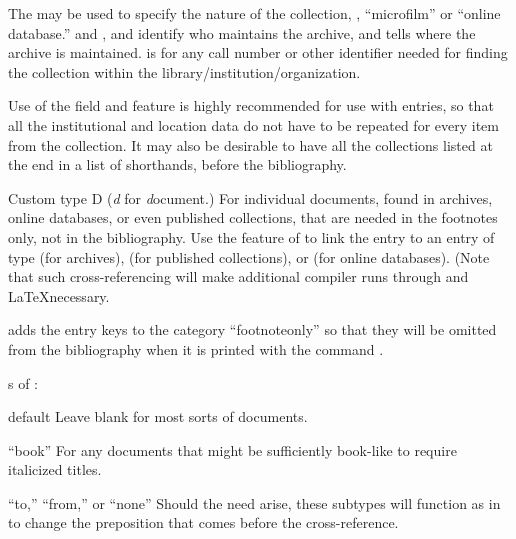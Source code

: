 \documentclass{ltxdockit}[2010/02/12]
\begin{document}
\begin{typelist}
The  may be used to specify the nature of the collection, \eg, ``microfilm'' or  ``online database.''  and , and  identify who maintains the archive, and  tells where the archive is maintained.   is for any call number or other identifier needed for finding the collection within the library/institution/organization.

Use of the   field and feature is highly recommended for use with  entries, so that all the institutional and location data do not have to be repeated for every item from the collection. It may also be desirable to have all the collections listed at the end in a list of shorthands, before the bibliography.



Custom type D (\emph{d} for \emph{d}ocument.)
For individual documents, found in archives, online databases, or even published collections, that are needed in the footnotes only, not in the bibliography. Use the  feature of to link the  entry to an entry of type  (for archives),  (for published collections), or  (for online databases). (Note that such cross-referencing will make additional compiler runs through  and \LaTeX necessary.

 adds the  entry keys to the category ``footnoteonly'' so that they will be omitted from the bibliography when it is printed with the command . 

s of :
\begin{valuelist}
\item[default] Leave  blank for most sorts of documents.
\item[``book''] For any documents that might be sufficiently book-like to require italicized titles.
\item[``to,'' ``from,'' or ``none''] Should the need arise, these subtypes will function as in  to change the preposition that comes before the cross-reference.
\end{valuelist}



\end{typelist}
\end{document}
